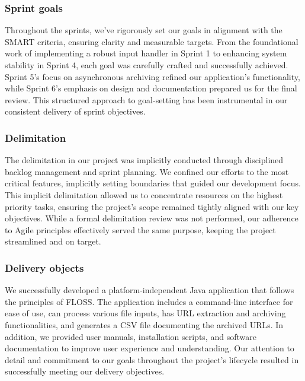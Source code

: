 \subsubsection{Sprint goals}
Throughout the sprints, we've rigorously set our goals in alignment with the SMART criteria, ensuring clarity and measurable targets.
From the foundational work of implementing a robust input handler in Sprint 1 to enhancing system stability in Sprint 4, each goal was carefully crafted and successfully achieved.
Sprint 5's focus on asynchronous archiving refined our application's functionality, while Sprint 6's emphasis on design and documentation prepared us for the final review.
This structured approach to goal-setting has been instrumental in our consistent delivery of sprint objectives.

\subsubsection{Delimitation}
The delimitation in our project was implicitly conducted through disciplined backlog management and sprint planning.
We confined our efforts to the most critical features, implicitly setting boundaries that guided our development focus.
This implicit delimitation allowed us to concentrate resources on the highest priority tasks, ensuring the project’s scope remained tightly aligned with our key objectives.
While a formal delimitation review was not performed, our adherence to Agile principles effectively served the same purpose, keeping the project streamlined and on target.

\subsubsection{Delivery objects}
We successfully developed a platform-independent Java application that follows the principles of FLOSS.
The application includes a command-line interface for ease of use, can process various file inputs, has URL extraction and archiving functionalities, and generates a CSV file documenting the archived URLs.
In addition, we provided user manuals, installation scripts, and software documentation to improve user experience and understanding.
Our attention to detail and commitment to our goals throughout the project's lifecycle resulted in successfully meeting our delivery objectives.

